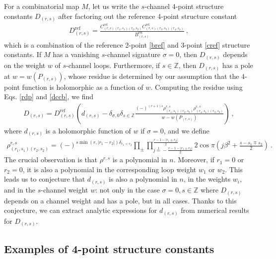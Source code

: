 \documentclass[12pt, a4paper]{article}
\newcommand{\qvertex}{
\coordinate (base) at (0, 1);
\draw (0, 0) node [cross]{};
  \draw (3, 0) node [cross]{};
  \draw (0, 3) node[cross]{};
  \draw (3, 3) node[cross]{};
}
\newcommand{\vertices}{
\coordinate (base) at (0, 1);
\draw (0, 0) node[fill, circle, minimum size = 1.3mm, inner sep = 0]{};
  \draw (3, 0) node[fill, circle, minimum size = 1.3mm, inner sep = 0]{};
  \draw (0, 3) node[fill, circle, minimum size = 1.3mm, inner sep = 0]{};
  \draw (3, 3) node[fill, circle, minimum size = 1.3mm, inner sep = 0]{};
}
\theoremstyle{break}
\begin{document}
For a combinatorial map $M$, let us write the $s$-channel 4-point structure constants $D_{(r,s)}$ after factoring out the reference 4-point structure constant 
\begin{align}
 D_{(r,s)}^\text{ref} = \frac{C^\text{ref}_{(r,s)(r_1,s_1)(r_2,s_2)} C^\text{ref}_{(r,s)(r_3,s_3)(r_4,s_4)}}{B^\text{ref}_{(r,s)}}\ , 
\end{align}
which is a combination of the reference 2-point \eqref{bref} and 3-point \eqref{cref} structure constants. If $M$ has a vanishing $s$-channel signature $\sigma=0$, then $D_{(r,s)}$ depends on the weight $w$ of $s$-channel loops. Furthermore, if $s\in\mathbb{Z}$, then $D_{(r,s)}$ has a pole at $w=w(P_{(r,s)})$, whose residue is determined by our assumption that the 4-point function is holomorphic as a function of $w$. Computing the residue using Eqs. \eqref{rdp} and \eqref{dccb}, we find 
\begin{align}
 D_{(r,s)} =  D_{(r,s)}^\text{ref} \left(d_{(r,s)}  - \delta_{\sigma,0}\delta_{s\in\mathbb{Z}}\frac{(-)^{(r+1)s}\rho^{r,s}_{(r_1,s_1)(r_2,s_2)}\rho^{r,s}_{(r_4,s_4)(r_3,s_3)}}{w-w(P_{(r,s)})}\right) \ ,
\end{align}
where $d_{(r,s)}$ is a holomorphic function of $w$ if $\sigma=0$, and we define
\begin{align}
\rho^{r,s}_{(r_1,s_1)(r_2,s_2)}= (-)^{s\min(r,|r_1-r_2|)\delta_{r_1<r_2}} \prod_\pm \prod_{j\overset{1}{=}-\frac{r-1-|r_1\pm r_2|}{2}}^{\frac{r-1-|r_1\pm r_2|}{2}} 2\cos\pi\left(j\beta^2+\tfrac{s-s_1\mp s_2}{2}\right)\ . 
 \label{rhop}
\end{align}
The crucial observation is that $\rho^{r,s}$ is a polynomial in $n$. Moreover, if $r_1=0$ or $r_2=0$, it is also a polynomial in the corresponding loop weight $w_1$ or $w_2$. This leads us to conjecture that $d_{(r,s)}$ is also a polynomial in $n$, in the weights $w_i$, and in the $s$-channel weight $w$: not only in the case $\sigma=0, s\in\mathbb{Z}$ where $D_{(r,s)}$ depends on a channel weight and has a pole, but in all cases. 
Thanks to this conjecture, we can extract analytic expressions for $d_{(r,s)}$ from numerical results for $D_{(r,s)}$. 


\subsection{Examples of 4-point structure constants}\label{sec:ex4pt}

\DeclareRobustCommand\picz{
$
\begin{tikzpicture}[baseline=(base), scale = .25]
 \qvertex;
 \end{tikzpicture}
 $
}
\DeclareRobustCommand\pice{
$
\begin{tikzpicture}[baseline=(base), scale = .25]
  \vertices
  \draw (0, 0) -- (0, 3);
  \draw (3, 0) -- (3, 3);
 \end{tikzpicture}
$}
\DeclareRobustCommand\picj{
$
\begin{tikzpicture}[baseline=(base), scale = .25]
  \vertices
  \draw (0, 0) -- (3, 3) to [out = -120, in = 30] (0, 0);
  \draw (0,0) -- (0, 3);
  \draw (0, 3) to [out = 30, in = 135] (3.5, 3.5) to [out = -45, in =60] (3, 0);
 \end{tikzpicture}
 $}
\end{document}
